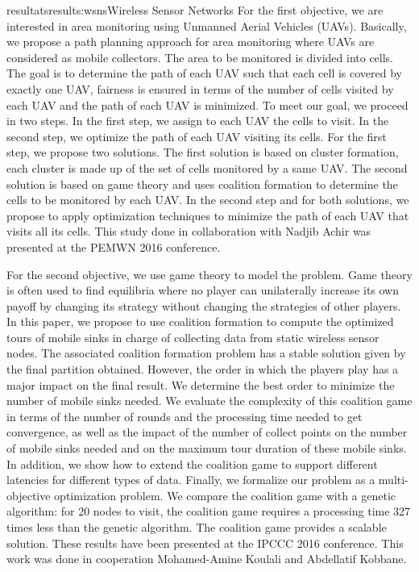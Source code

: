 \documentclass{ra2016}
\begin{document}
\begin{module}{resultats}{results:wsns}{Wireless Sensor Networks}
For the first objective, we are interested in area monitoring using Unmanned Aerial Vehicles (UAVs).
Basically, we propose a path planning approach for area monitoring where UAVs are considered as mobile collectors.
The area to be monitored is divided into cells.
The goal is to determine the path of each UAV such that each cell is covered by exactly one UAV, fairness is ensured in terms of the number of cells visited by each UAV and the path of each UAV is minimized.
To meet our goal, we proceed in two steps.
In the first step, we assign to each UAV the cells to visit.
In the second step, we optimize the path of each UAV visiting its cells.
For the first step, we propose two solutions.
The first solution is based on cluster formation, each cluster is made up of the set of cells monitored by a same UAV.
The second solution is based on game theory and uses coalition formation to determine the cells to be monitored by each UAV.
In the second step and for both solutions, we propose to apply optimization techniques to minimize the path of each UAV that visits all its cells.
This study done in collaboration with Nadjib Achir 
was presented at the PEMWN 2016 conference.

For the second objective, we use game theory to model the problem.
Game theory is often used to find equilibria where no player can unilaterally increase its own payoff by changing its strategy without changing the strategies of other players.
In this paper, we propose to use coalition formation to compute the optimized tours of mobile sinks in charge of collecting data from static wireless sensor nodes.
The associated coalition formation problem has a stable solution given by the final partition obtained.
However, the order in which the players play has a major impact on the final result.
We determine the best order to minimize the number of mobile sinks needed.
We evaluate the complexity of this coalition game in terms of the number of rounds and the processing time needed to get convergence, as well as the impact of the number of collect points on the number of mobile sinks needed and on the maximum tour duration of these mobile sinks.
In addition, we show how to extend the coalition game to support different latencies for different types of data.
Finally, we formalize our problem as a multi-objective optimization problem.
We compare the coalition game with a genetic algorithm: for 20 nodes to visit, the coalition game requires a processing time 327 times less than the genetic algorithm.
The coalition game provides a scalable solution.
These results have been presented at the IPCCC 2016 conference.
This work was done in cooperation Mohamed-Amine Koulali and Abdellatif Kobbane.


\end{module}
\end{document}
